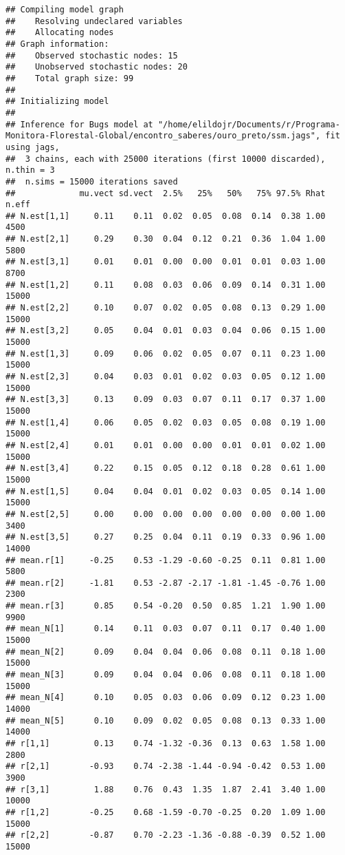 \documentclass[]{tufte-handout}
\begin{document}
\begin{verbatim}
## Compiling model graph
##    Resolving undeclared variables
##    Allocating nodes
## Graph information:
##    Observed stochastic nodes: 15
##    Unobserved stochastic nodes: 20
##    Total graph size: 99
## 
## Initializing model
## 
## Inference for Bugs model at "/home/elildojr/Documents/r/Programa-Monitora-Florestal-Global/encontro_saberes/ouro_preto/ssm.jags", fit using jags,
##  3 chains, each with 25000 iterations (first 10000 discarded), n.thin = 3
##  n.sims = 15000 iterations saved
##             mu.vect sd.vect  2.5%   25%   50%   75% 97.5% Rhat n.eff
## N.est[1,1]     0.11    0.11  0.02  0.05  0.08  0.14  0.38 1.00  4500
## N.est[2,1]     0.29    0.30  0.04  0.12  0.21  0.36  1.04 1.00  5800
## N.est[3,1]     0.01    0.01  0.00  0.00  0.01  0.01  0.03 1.00  8700
## N.est[1,2]     0.11    0.08  0.03  0.06  0.09  0.14  0.31 1.00 15000
## N.est[2,2]     0.10    0.07  0.02  0.05  0.08  0.13  0.29 1.00 15000
## N.est[3,2]     0.05    0.04  0.01  0.03  0.04  0.06  0.15 1.00 15000
## N.est[1,3]     0.09    0.06  0.02  0.05  0.07  0.11  0.23 1.00 15000
## N.est[2,3]     0.04    0.03  0.01  0.02  0.03  0.05  0.12 1.00 15000
## N.est[3,3]     0.13    0.09  0.03  0.07  0.11  0.17  0.37 1.00 15000
## N.est[1,4]     0.06    0.05  0.02  0.03  0.05  0.08  0.19 1.00 15000
## N.est[2,4]     0.01    0.01  0.00  0.00  0.01  0.01  0.02 1.00 15000
## N.est[3,4]     0.22    0.15  0.05  0.12  0.18  0.28  0.61 1.00 15000
## N.est[1,5]     0.04    0.04  0.01  0.02  0.03  0.05  0.14 1.00 15000
## N.est[2,5]     0.00    0.00  0.00  0.00  0.00  0.00  0.00 1.00  3400
## N.est[3,5]     0.27    0.25  0.04  0.11  0.19  0.33  0.96 1.00 14000
## mean.r[1]     -0.25    0.53 -1.29 -0.60 -0.25  0.11  0.81 1.00  5800
## mean.r[2]     -1.81    0.53 -2.87 -2.17 -1.81 -1.45 -0.76 1.00  2300
## mean.r[3]      0.85    0.54 -0.20  0.50  0.85  1.21  1.90 1.00  9900
## mean_N[1]      0.14    0.11  0.03  0.07  0.11  0.17  0.40 1.00 15000
## mean_N[2]      0.09    0.04  0.04  0.06  0.08  0.11  0.18 1.00 15000
## mean_N[3]      0.09    0.04  0.04  0.06  0.08  0.11  0.18 1.00 15000
## mean_N[4]      0.10    0.05  0.03  0.06  0.09  0.12  0.23 1.00 14000
## mean_N[5]      0.10    0.09  0.02  0.05  0.08  0.13  0.33 1.00 14000
## r[1,1]         0.13    0.74 -1.32 -0.36  0.13  0.63  1.58 1.00  2800
## r[2,1]        -0.93    0.74 -2.38 -1.44 -0.94 -0.42  0.53 1.00  3900
## r[3,1]         1.88    0.76  0.43  1.35  1.87  2.41  3.40 1.00 10000
## r[1,2]        -0.25    0.68 -1.59 -0.70 -0.25  0.20  1.09 1.00 15000
## r[2,2]        -0.87    0.70 -2.23 -1.36 -0.88 -0.39  0.52 1.00 15000

\end{verbatim}
\end{document}
